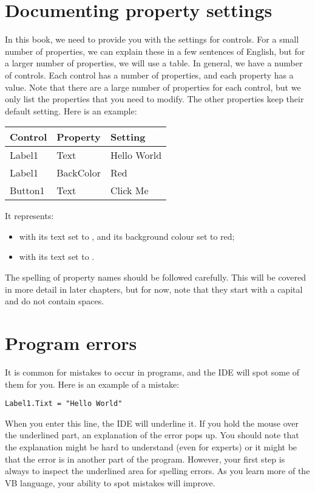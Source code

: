 	\section{Documenting property settings}
		In this book, we need to provide you with the settings for controls. For a small number of properties, we can explain these in a few sentences of English, but for a larger number of properties, we will use a table. In general, we have a number of controls. Each control has a number of properties, and each property has a value. Note that 
there are a large number of properties for each control, but we only list the properties 
that you need to modify. The other properties keep their default setting. Here is an example:
		\begin{center}
			\begin{tabular}{lll}
				\toprule Control & Property & Setting\\ \midrule
				Label1 & Text & Hello World\\
				Label1 &BackColor & Red \\
				Button1 & Text & Click Me\\ \bottomrule
			\end{tabular}
		\end{center}
 		It represents:
			\begin{itemize}
				\item {} with its text set to , and its background colour set to red;
				\item {} with its text set to .
		\end{itemize}
		The spelling of property names should be followed carefully. This will be covered in more detail in later chapters, but for now, note that they start with a capital and do not contain spaces.
	\section{Program errors}
		It is common for mistakes to occur in programs, and the IDE will spot some of them for you. Here is an example of a mistake:
		\begin{lstlisting}
Label1.Tixt = "Hello World"
		\end{lstlisting}
		When you enter this line, the IDE will underline it. If you hold the mouse over the underlined part, an explanation of the error pops up. You should note that the explanation might be hard to understand (even for experts) or it might be that the error is in another part of the program. However, your first step is always to inspect the underlined area for spelling errors. As you learn more of the VB language, your ability to spot mistakes will improve.

